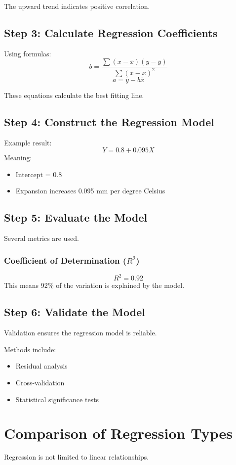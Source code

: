 \documentclass[12pt,a4paper]{article}
\begin{document}
	The upward trend indicates positive correlation.
	
	\subsection{Step 3: Calculate Regression Coefficients}
	Using formulas:
	\[
	b = \frac{\sum (x - \bar{x})(y - \bar{y})}{\sum (x - \bar{x})^2}
	\]
	\[
	a = \bar{y} - b\bar{x}
	\]
	
	These equations calculate the best fitting line.
	
	\subsection{Step 4: Construct the Regression Model}
	Example result:
	\[
	Y = 0.8 + 0.095X
	\]
	Meaning:
	\begin{itemize}
		\item Intercept = 0.8
		\item Expansion increases 0.095 mm per degree Celsius
	\end{itemize}
	
	\subsection{Step 5: Evaluate the Model}
	Several metrics are used.
	
	\subsubsection{Coefficient of Determination ($R^2$)}
	\[
	R^2 = 0.92
	\]
	This means 92\% of the variation is explained by the model.
	
	\subsection{Step 6: Validate the Model}
	Validation ensures the regression model is reliable.
	
	Methods include:
	\begin{itemize}
		\item Residual analysis
		\item Cross-validation
		\item Statistical significance tests
	\end{itemize}
	
	\section{Comparison of Regression Types}
	Regression is not limited to linear relationships.
	
\end{document}
